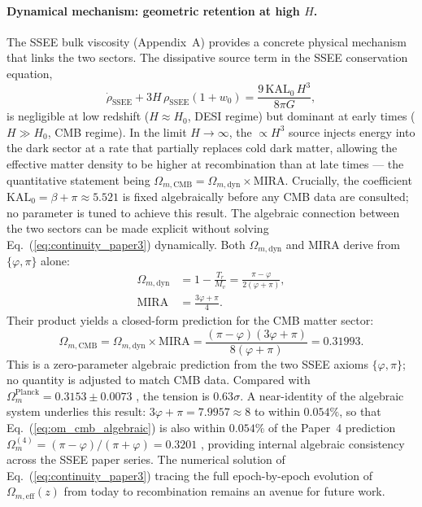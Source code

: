 \documentclass[12pt,a4paper]{article}
\begin{document}
\paragraph{Dynamical mechanism: geometric retention at high $H$.}
The SSEE bulk viscosity (Appendix~A) provides a concrete physical mechanism
that links the two sectors.
The dissipative source term in the SSEE conservation equation,
\begin{equation}
  \dot{\rho}_{\mathrm{SSEE}}
    + 3H\,\rho_{\mathrm{SSEE}}(1+w_0)
    = \frac{9\,\mathrm{KAL}_0\,H^3}{8\pi G},
  \label{eq:continuity_paper3}
\end{equation}
is negligible at low redshift ($H\approx H_0$, DESI regime) but dominant at
early times ($H\gg H_0$, CMB regime).
In the limit $H\to\infty$, the $\propto H^3$ source injects energy into the dark
sector at a rate that partially replaces cold dark matter, allowing the effective
matter density to be higher at recombination than at late times — the quantitative
statement being $\Omega_{m,\mathrm{CMB}}=\Omega_{m,\mathrm{dyn}}\times\mathrm{MIRA}$.
Crucially, the coefficient $\mathrm{KAL}_0=\beta+\pi\approx5.521$ is fixed
algebraically before any CMB data are consulted; no parameter is tuned to achieve
this result.
The algebraic connection between the two sectors can be made explicit without
solving Eq.~(\ref{eq:continuity_paper3}) dynamically.
Both $\Omega_{m,\mathrm{dyn}}$ and MIRA derive from $\{\varphi,\pi\}$ alone:
\begin{align}
  \Omega_{m,\mathrm{dyn}} &= 1 - \frac{T_r}{M_v}
    = \frac{\pi - \varphi}{2(\varphi+\pi)}, \label{eq:om_dyn_alg} \\
  \mathrm{MIRA} &= \frac{3\varphi+\pi}{4}. \label{eq:mira_alg}
\end{align}
Their product yields a closed-form prediction for the CMB matter sector:
\begin{equation}
  \Omega_{m,\mathrm{CMB}}
    = \Omega_{m,\mathrm{dyn}} \times \mathrm{MIRA}
    = \frac{(\pi-\varphi)(3\varphi+\pi)}{8(\varphi+\pi)}
    = 0.31993.
  \label{eq:om_cmb_algebraic}
\end{equation}
This is a zero-parameter algebraic prediction from the two SSEE axioms
$\{\varphi, \pi\}$; no quantity is adjusted to match CMB data.
Compared with $\Omega_m^{\mathrm{Planck}}=0.3153\pm0.0073$
\citep{Planck2018}, the tension is $0.63\sigma$.
A near-identity of the algebraic system underlies this result: $3\varphi+\pi =
7.9957\approx8$ to within $0.054\%$, so that
Eq.~(\ref{eq:om_cmb_algebraic}) is also within $0.054\%$ of the
Paper~4 prediction $\Omega_m^{(4)}=(\pi-\varphi)/(\pi+\varphi)=0.3201$
\citep{AlmeidaSSEE2026paper4},
providing internal algebraic consistency across the SSEE paper series.
The numerical solution of Eq.~(\ref{eq:continuity_paper3}) tracing
the full epoch-by-epoch evolution of $\Omega_{m,\mathrm{eff}}(z)$ from
today to recombination remains an avenue for future work.
\end{document}
